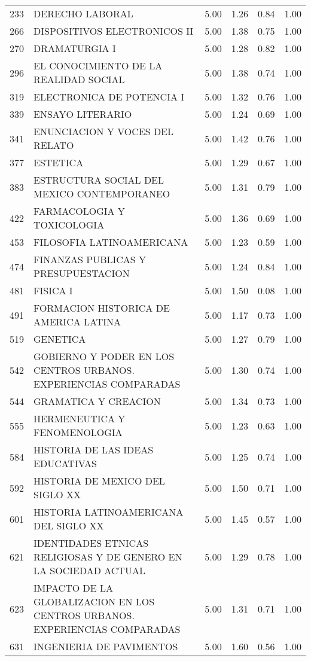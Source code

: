 \documentclass[12pt]{article}
\begin{document}
\begin{table}[ht]
\begin{tabular}{rlrrrr}
  233 & DERECHO LABORAL & 5.00 & 1.26 & 0.84 & 1.00 \\ 
  266 & DISPOSITIVOS ELECTRONICOS II & 5.00 & 1.38 & 0.75 & 1.00 \\ 
  270 & DRAMATURGIA I & 5.00 & 1.28 & 0.82 & 1.00 \\ 
  296 & EL CONOCIMIENTO DE LA REALIDAD SOCIAL & 5.00 & 1.38 & 0.74 & 1.00 \\ 
  319 & ELECTRONICA DE POTENCIA I & 5.00 & 1.32 & 0.76 & 1.00 \\ 
  339 & ENSAYO LITERARIO & 5.00 & 1.24 & 0.69 & 1.00 \\ 
  341 & ENUNCIACION Y VOCES DEL RELATO & 5.00 & 1.42 & 0.76 & 1.00 \\ 
  377 & ESTETICA & 5.00 & 1.29 & 0.67 & 1.00 \\ 
  383 & ESTRUCTURA SOCIAL DEL MEXICO CONTEMPORANEO & 5.00 & 1.31 & 0.79 & 1.00 \\ 
  422 & FARMACOLOGIA Y TOXICOLOGIA & 5.00 & 1.36 & 0.69 & 1.00 \\ 
  453 & FILOSOFIA LATINOAMERICANA & 5.00 & 1.23 & 0.59 & 1.00 \\ 
  474 & FINANZAS PUBLICAS Y PRESUPUESTACION & 5.00 & 1.24 & 0.84 & 1.00 \\ 
  481 & FISICA I & 5.00 & 1.50 & 0.08 & 1.00 \\ 
  491 & FORMACION HISTORICA DE AMERICA LATINA & 5.00 & 1.17 & 0.73 & 1.00 \\ 
  519 & GENETICA & 5.00 & 1.27 & 0.79 & 1.00 \\ 
  542 & GOBIERNO Y PODER EN LOS CENTROS URBANOS. EXPERIENCIAS COMPARADAS & 5.00 & 1.30 & 0.74 & 1.00 \\ 
  544 & GRAMATICA Y CREACION & 5.00 & 1.34 & 0.73 & 1.00 \\ 
  555 & HERMENEUTICA Y FENOMENOLOGIA & 5.00 & 1.23 & 0.63 & 1.00 \\ 
  584 & HISTORIA DE LAS IDEAS EDUCATIVAS & 5.00 & 1.25 & 0.74 & 1.00 \\ 
  592 & HISTORIA DE MEXICO DEL SIGLO XX & 5.00 & 1.50 & 0.71 & 1.00 \\ 
  601 & HISTORIA LATINOAMERICANA DEL SIGLO XX & 5.00 & 1.45 & 0.57 & 1.00 \\ 
  621 & IDENTIDADES ETNICAS RELIGIOSAS Y DE GENERO EN LA SOCIEDAD ACTUAL & 5.00 & 1.29 & 0.78 & 1.00 \\ 
  623 & IMPACTO DE LA GLOBALIZACION EN LOS CENTROS URBANOS. EXPERIENCIAS COMPARADAS & 5.00 & 1.31 & 0.71 & 1.00 \\ 
  631 & INGENIERIA DE PAVIMENTOS & 5.00 & 1.60 & 0.56 & 1.00 \\ 

\end{tabular}
\end{table}
\end{document}
